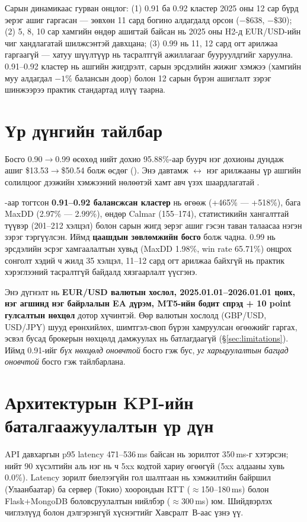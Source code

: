 Сарын динамикаас гурван онцлог: (1) 0.91 ба 0.92 кластер 2025 оны 12 сар бүрд эерэг ашиг гаргасан --- зөвхөн 11 сард богино алдагдалд орсон ($-\$638$, $-\$30$); (2) 5, 8, 10 сар хамгийн өндөр ашигтай байсан нь 2025 оны H2-д EUR/USD-ийн чиг хандлагатай шилжсэнтэй давхцана; (3) 0.99 нь 11, 12 сард огт арилжаа гаргаагүй --- хатуу шүүлтүүр нь тасралтгүй ажиллагааг бууруулдгийг харуулна. 0.91--0.92 кластер нь ашгийн жигдрэлт, сарын эрсдэлийн жижиг хэмжээ (хамгийн муу алдагдал $-1\%$ балансын доор) болон 12 сарын бүрэн ашиглалт зэрэг шинжээрээ практик стандартад илүү таарна.

\section{Үр дүнгийн тайлбар}
\label{sec:result_interpretation}

Босго 0.90$\to$0.99 өсөхөд нийт дохио 95.88\%-аар буурч нэг дохионы дундаж ашиг \$13.53$\to$\$50.54 болж өсдөг (). Энэ давтамж $\leftrightarrow$ нэг арилжааны үр ашгийн солилцоог дээжийн хэмжээний нөлөөтэй хамт авч үзэх шаардлагатай \cite{pardo2008evaluation,bailey2014probability}.

-аар тогтсон \textbf{0.91--0.92 балансжсан кластер} нь өгөөж (+465\% --- +518\%), бага MaxDD (2.97\% --- 2.99\%), өндөр Calmar (155--174), статистикийн хангалттай түүвэр (201--212 хэлцэл) болон сарын жигд эерэг ашиг гэсэн таван талаасаа нэгэн зэрэг тэргүүлсэн. Иймд \textbf{цаашдын зөвлөмжийн босго} болж чадна. 0.99 нь эрсдэлийн эсрэг хамгаалалтын хувьд (MaxDD 1.98\%, win rate 65.71\%) онцрох сонголт хэдий ч жилд 35 хэлцэл, 11--12 сард огт арилжаа байхгүй нь практик хэрэглээний тасралтгүй байдалд хязгаарлалт үүсгэнэ.

Энэ дүгнэлт нь \textbf{EUR/USD валютын хослол, 2025.01.01--2026.01.01 цонх, нэг агшинд нэг байрлалын EA дүрэм, MT5-ийн бодит спрэд + 10 point гулсалтын нөхцөл} дотор хүчинтэй. Өөр валютын хослолд (GBP/USD, USD/JPY) шууд ерөнхийлөх, шимтгэл-своп бүрэн хамруулсан өгөөжийг гаргах, эсвэл бусад брокерын нөхцөлд дамжуулах нь батлагдаагүй (§\ref{sec:limitations}). Иймд 0.91-ийг \textit{бүх нөхцөлд оновчтой} босго гэж бус, \textit{уг харьцуулалтын багцад оновчтой} босго гэж тайлбарлана.

\section{Архитектурын KPI-ийн баталгаажуулалтын үр дүн}
\label{sec:kpi_results}

API давхаргын p95 latency 471--536\,ms байсан нь зорилтот 350\,ms-г хэтэрсэн; нийт 90 хүсэлтийн аль нэг нь ч 5xx кодтой хариу өгөөгүй (5xx алдааны хувь 0.0\%). Latency зорилт биелээгүйн гол шалтгаан нь хэмжилтийн байршил (Улаанбаатар) ба сервер (Токио) хоорондын RTT ($\approx$150--180\,ms) болон Flask+MongoDB боловсруулалтын нийлбэр ($\approx$300\,ms) юм. Шийдвэрлэх чиглэлүүд болон дэлгэрэнгүй хүснэгтийг Хавсралт~В-аас үзнэ үү.
